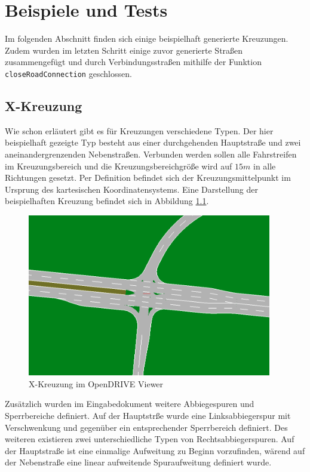 \chapter{Beispiele und Tests}

Im folgenden Abschnitt finden sich einige beispielhaft generierte Kreuzungen. Zudem wurden im letzten Schritt einige zuvor generierte Straßen zusammengefügt und durch Verbindungsstraßen mithilfe der Funktion \texttt{closeRoadConnection} geschlossen.

\section{X-Kreuzung}
Wie schon erläutert gibt es für Kreuzungen verschiedene Typen. Der hier beispielhaft gezeigte Typ besteht aus einer durchgehenden Hauptstraße und zwei aneinandergrenzenden Nebenstraßen. Verbunden werden sollen alle Fahrstreifen im Kreuzungsbereich und die Kreuzungsbereichgröße wird auf \(15 m\) in alle Richtungen gesetzt. Per Definition befindet sich der Kreuzungsmittelpunkt im Ursprung des kartesischen Koordinatensystems. Eine Darstellung der beispielhaften Kreuzung befindet sich in Abbildung \ref{abb6}.

\begin{figure}[H]
\flushleft
\includegraphics[width=0.95\textwidth]{fig/junction4.png}
\caption{X-Kreuzung im OpenDRIVE Viewer}
\label{abb6}
\end{figure}

Zusätzlich wurden im Eingabedokument weitere Abbiegespuren und Sperrbereiche definiert. Auf der Hauptstrße wurde eine Linksabbiegerspur mit Verschwenkung und gegenüber ein entsprechender Sperrbereich definiert. Des weiteren existieren zwei unterschiedliche Typen von Rechtsabbiegerspuren. Auf der Hauptstraße ist eine einmalige Aufweitung zu Beginn vorzufinden, wärend auf der Nebenstraße eine linear aufweitende Spuraufweitung definiert wurde. 

